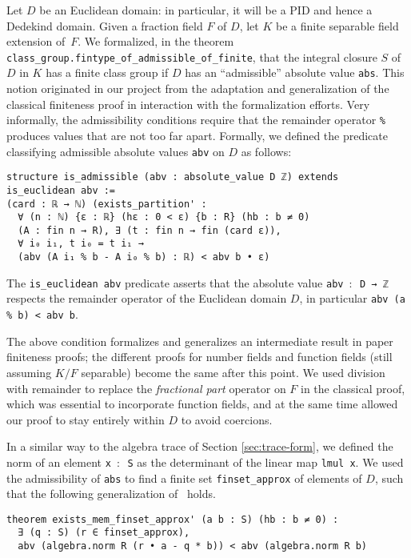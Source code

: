 \documentclass[sn-mathphys]{sn-jnl}%
\newcommand{\lean}[1]{\texttt{#1}\xspace}
\begin{document}
Let $D$ be an Euclidean domain: in particular, it will be a PID and hence a Dedekind domain. Given a fraction field $F$ of $D$, let $K$ be a finite separable field extension of~$F$.
We formalized, in the theorem \lean{class\_group.fintype\_of\_\-admissible\_\-of\_finite}, that the integral closure $S$ of $D$ in $K$ has a finite class group if $D$ has an ``admissible'' absolute value \lean{abs}.
This notion originated in our project from the adaptation and generalization of the classical finiteness proof in interaction with the formalization efforts.
Very informally, the admissibility conditions require that the remainder operator \lean{\%} produces values that are not too far apart.
Formally, we defined the predicate classifying admissible absolute values \lean{abv} on $D$ as follows:
\pagebreak[3] %
\begin{lstlisting}
structure is_admissible (abv : absolute_value D ℤ) extends is_euclidean abv :=
(card : ℝ → ℕ) (exists_partition' :
  ∀ (n : ℕ) {ε : ℝ} (hε : 0 < ε) {b : R} (hb : b ≠ 0)
  (A : fin n → R), ∃ (t : fin n → fin (card ε)),
  ∀ i₀ i₁, t i₀ = t i₁ →
  (abv (A i₁ % b - A i₀ % b) : ℝ) < abv b • ε)
\end{lstlisting}
The \lean{is\_euclidean abv} predicate asserts that the absolute value \lean{abv $:$ D → ℤ} respects the remainder operator of the Euclidean domain $D$, in particular \lean{abv (a \% b) < abv b}.

The above condition formalizes and generalizes an intermediate result in paper finiteness proofs;
the different proofs for number fields and function fields (still assuming $K/F$ separable) become the same after this point.
We used division with remainder to replace the \emph{fractional part} operator on $F$ in the classical proof, which was essential to incorporate function fields, and at the same time allowed our proof to stay entirely within $D$ to avoid coercions.

In a similar way to the algebra trace of Section \ref{sec:trace-form}, we defined the norm of an element \lean{x $:$ S} as the determinant of the linear map \lean{lmul x}.
We used the admissibility of \lean{abs} to find a finite set \lean{finset\_approx} of elements of $D$,
such that the following generalization of~\cite[Theorem~12.2.1]{Ireland-Rosen} holds.
\begin{lstlisting}
theorem exists_mem_finset_approx' (a b : S) (hb : b ≠ 0) :
  ∃ (q : S) (r ∈ finset_approx),
  abv (algebra.norm R (r • a - q * b)) < abv (algebra.norm R b)
\end{lstlisting}
\end{document}
